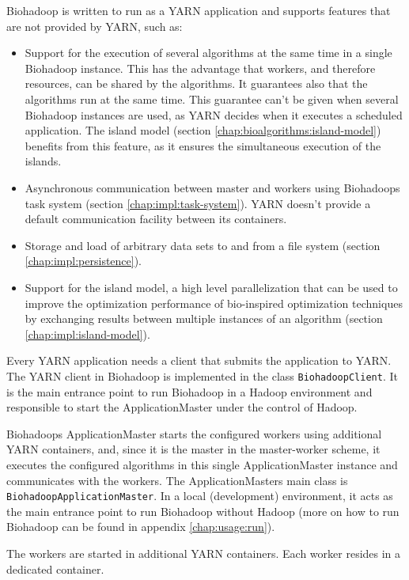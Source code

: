 Biohadoop is written to run as a YARN application and supports features that are not provided by YARN, such as:

\begin{itemize}
  \item Support for the execution of several algorithms at the same time in a single Biohadoop instance. This has the advantage that workers, and therefore resources, can be shared by the algorithms. It guarantees also that the algorithms run at the same time. This guarantee can't be given when several Biohadoop instances are used, as YARN decides when it executes a scheduled application. The island model (section \ref{chap:bioalgorithms:island-model}) benefits from this feature, as it ensures the simultaneous execution of the islands.
  \item Asynchronous communication between master and workers using Biohadoops task system (section \ref{chap:impl:task-system}). YARN doesn't provide a default communication facility between its containers.
  \item Storage and load of arbitrary data sets to and from a file system (section \ref{chap:impl:persistence}).
  \item Support for the island model, a high level parallelization that can be used to improve the optimization performance of bio-inspired optimization techniques by exchanging results between multiple instances of an algorithm (section \ref{chap:impl:island-model}).
\end{itemize}

Every YARN application needs a client that submits the application to YARN. The YARN client in Biohadoop is implemented in the class \texttt{BiohadoopClient}. It is the main entrance point to run Biohadoop in a Hadoop environment and responsible to start the ApplicationMaster under the control of Hadoop.

Biohadoops ApplicationMaster starts the configured workers using additional YARN containers, and, since it is the master in the master-worker scheme, it executes the configured algorithms in this single ApplicationMaster instance and communicates with the workers. The ApplicationMasters main class is \texttt{BiohadoopApplicationMaster}. In a local (development) environment, it acts as the main entrance point to run Biohadoop without Hadoop (more on how to run Biohadoop can be found in appendix \ref{chap:usage:run}).

The workers are started in additional YARN containers. Each worker resides in a dedicated container.

